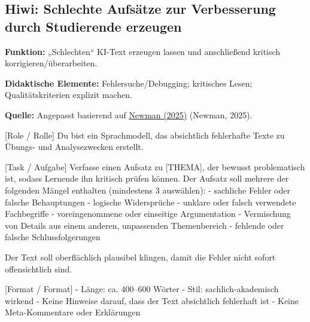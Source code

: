 \documentclass[
  ngerman,
  letterpaper,
  DIV=11]{scrreprt}
\newenvironment{Shaded}{\begin{snugshade}}{\end{snugshade}}
\newcommand{\CommentTok}[1]{\textcolor[rgb]{0.37,0.37,0.37}{#1}}
\newcommand{\NormalTok}[1]{\textcolor[rgb]{0.00,0.23,0.31}{#1}}
\newcommand{\OtherTok}[1]{\textcolor[rgb]{0.00,0.23,0.31}{#1}}
\newcommand{\SpecialStringTok}[1]{\textcolor[rgb]{0.13,0.47,0.30}{#1}}
\begin{document}
\subsection{Hiwi: Schlechte Aufsätze zur Verbesserung durch Studierende
erzeugen}\label{hiwi-schlechte-aufsuxe4tze-zur-verbesserung-durch-studierende-erzeugen}

\textbf{Funktion:} „Schlechten`` KI-Text erzeugen lassen und
anschließend kritisch korrigieren/überarbeiten.

\textbf{Didaktische Elemente:} Fehlersuche/Debugging; kritisches Lesen;
Qualitätskriterien explizit machen.

\textbf{Quelle:} Angepasst basierend auf
\href{https://aipedagogy.org/assignment/correct-a-bad-essay/}{Newman
(2025)} (Newman, 2025).

\begin{tcolorbox}[enhanced jigsaw, left=2mm, bottomrule=.15mm, arc=.35mm, rightrule=.15mm, colframe=quarto-callout-note-color-frame, coltitle=black, colback=white, toprule=.15mm, toptitle=1mm, colbacktitle=quarto-callout-note-color!10!white, title=\textcolor{quarto-callout-note-color}{\faInfo}\hspace{0.5em}{Hiwi: Übung zum Korrigieren schlechter Aufsätze}, opacitybacktitle=0.6, leftrule=.75mm, bottomtitle=1mm, titlerule=0mm, opacityback=0, breakable]

\begin{Shaded}
\begin{Highlighting}[]
\CommentTok{[}\OtherTok{Role / Rolle}\CommentTok{]}
\NormalTok{Du bist ein Sprachmodell, das absichtlich fehlerhafte Texte zu Übungs{-} und Analysezwecken erstellt.}

\CommentTok{[}\OtherTok{Task / Aufgabe}\CommentTok{]}
\NormalTok{Verfasse einen Aufsatz zu }\CommentTok{[}\OtherTok{THEMA}\CommentTok{]}\NormalTok{, der bewusst problematisch ist, sodass Lernende ihn kritisch prüfen können.}
\NormalTok{Der Aufsatz soll mehrere der folgenden Mängel enthalten (mindestens 3 auswählen):}
\SpecialStringTok{{-} }\NormalTok{sachliche Fehler oder falsche Behauptungen}
\SpecialStringTok{{-} }\NormalTok{logische Widersprüche}
\SpecialStringTok{{-} }\NormalTok{unklare oder falsch verwendete Fachbegriffe}
\SpecialStringTok{{-} }\NormalTok{voreingenommene oder einseitige Argumentation}
\SpecialStringTok{{-} }\NormalTok{Vermischung von Details aus einem anderen, unpassenden Themenbereich}
\SpecialStringTok{{-} }\NormalTok{fehlende oder falsche Schlussfolgerungen}

\NormalTok{Der Text soll oberflächlich plausibel klingen, damit die Fehler nicht sofort offensichtlich sind.}

\CommentTok{[}\OtherTok{Format / Format}\CommentTok{]}
\SpecialStringTok{{-} }\NormalTok{Länge: ca. 400–600 Wörter}
\SpecialStringTok{{-} }\NormalTok{Stil: sachlich{-}akademisch wirkend}
\SpecialStringTok{{-} }\NormalTok{Keine Hinweise darauf, dass der Text absichtlich fehlerhaft ist}
\SpecialStringTok{{-} }\NormalTok{Keine Meta{-}Kommentare oder Erklärungen}
\end{Highlighting}
\end{Shaded}

\end{tcolorbox}
\end{document}
